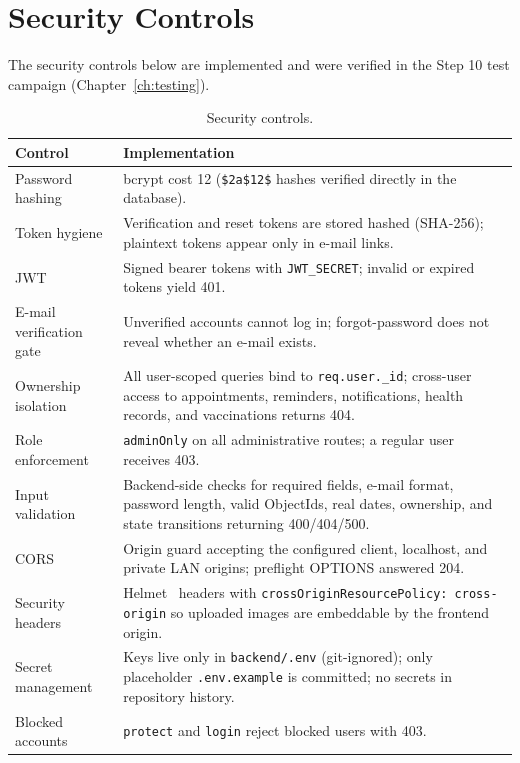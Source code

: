 \section{Security Controls}
\label{sec:security}

The security controls below are implemented and were verified in the Step 10
test campaign (Chapter~\ref{ch:testing}).

\begin{center}
\begin{longtable}{@{}p{3.6cm}p{11.0cm}@{}}
\caption{Security controls.}
\label{tab:security}\\
\toprule
\textbf{Control} & \textbf{Implementation} \\
\midrule
Password hashing & bcrypt cost 12 (\texttt{\$2a\$12\$} hashes verified directly
in the database). \\
Token hygiene & Verification and reset tokens are stored hashed (SHA-256);
plaintext tokens appear only in e-mail links. \\
JWT & Signed bearer tokens with \texttt{JWT\_SECRET}; invalid or expired tokens
yield 401. \\
E-mail verification gate & Unverified accounts cannot log in; forgot-password
does not reveal whether an e-mail exists. \\
Ownership isolation & All user-scoped queries bind to \texttt{req.user.\_id};
cross-user access to appointments, reminders, notifications, health records, and
vaccinations returns 404. \\
Role enforcement & \texttt{adminOnly} on all administrative routes; a regular
user receives 403. \\
Input validation & Backend-side checks for required fields, e-mail format,
password length, valid ObjectIds, real dates, ownership, and state transitions
returning 400/404/500. \\
CORS & Origin guard accepting the configured client, localhost, and private LAN
origins; preflight OPTIONS answered 204. \\
Security headers & Helmet~\cite{helmet} headers with \texttt{crossOriginResourcePolicy:
cross-origin} so uploaded images are embeddable by the frontend origin. \\
Secret management & Keys live only in \texttt{backend/.env} (git-ignored);
only placeholder \texttt{.env.example} is committed; no secrets in repository
history. \\
Blocked accounts & \texttt{protect} and \texttt{login} reject blocked users with
403. \\
\bottomrule
\end{longtable}
\end{center}

